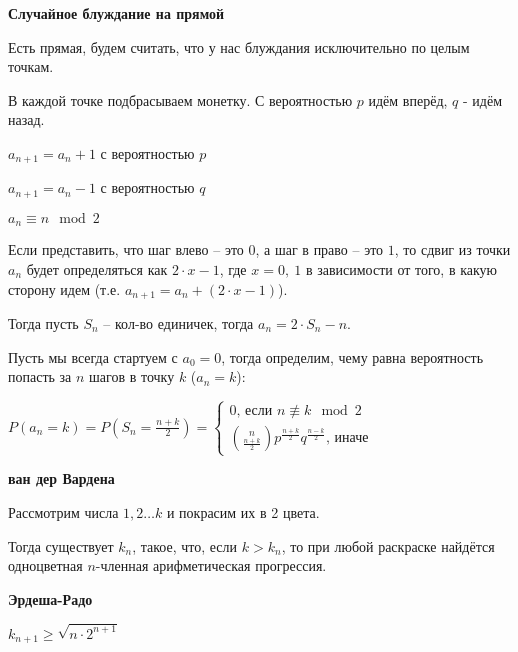 \begin{example}
    \textbf{Случайное блуждание на прямой}

    Есть прямая, будем считать, что у нас блуждания исключительно по целым точкам.

    В каждой точке подбрасываем монетку. С вероятностью $p$ идём вперёд, $q$ - идём назад.

    $a_{n + 1} = a_{n} + 1$ с вероятностью $p$

    $a_{n + 1} = a_{n} - 1$ с вероятностью $q$

    $a_n \equiv n \mod 2$

    Если представить, что шаг влево -- это $0$, а шаг в право -- это $1$, то сдвиг из точки $a_n$ будет определяться как $2 \cdot x - 1$, где $x = 0, \ 1$ в зависимости от того, в какую сторону идем (т.е. $a_{n+1} = a_n + (2\cdot x - 1)$).

    Тогда пусть $S_n$ -- кол-во единичек, тогда $a_n = 2\cdot S_n - n$.

    Пусть мы всегда стартуем с $a_0 = 0$, тогда определим, чему равна вероятность попасть за $n$ шагов в точку $k$ ($a_n = k$):

    $P(a_n = k) = P(S_n = \frac{n + k}{2}) = \begin{cases}
        0 \text{, если } n \not \equiv k \mod 2 \\
        \binom{n}{\frac{n + k}{2}} p^{\frac{n + k}{2}} q^{\frac{n - k}{2}} \text{, иначе}
    \end{cases}$
\end{example}

\begin{theorem}
    \textbf{ван дер Вардена}

    Рассмотрим числа $1, 2 \ldots k$ и покрасим их в 2 цвета.

    Тогда существует $k_n$, такое, что, если $k > k_n$, то при любой раскраске
    найдётся одноцветная $n$-членная арифметическая прогрессия.
\end{theorem}

\begin{theorem}
    \textbf{Эрдеша-Радо}

    $k_{n + 1} \geqslant \sqrt{n \cdot 2^{n + 1}}$
\end{theorem}

